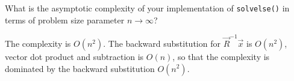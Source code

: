 \begin{problem}
\begin{subproblem}[2]
\label{subprb:PartitionedMatrix_f}
 What is the asymptotic complexity of your implementation of \verb|solvelse()| in terms of problem size parameter $n \rightarrow \infty$?
\end{subproblem}

\begin{solution}
 The complexity is $O(n^2)$. The backward substitution for $\vec{R}^{-1} \vec{x}$ is $O(n^2)$, vector dot product and subtraction is $O(n)$, so that the complexity is dominated by the backward substitution $O(n^2)$.
\end{solution}
\end{problem}
